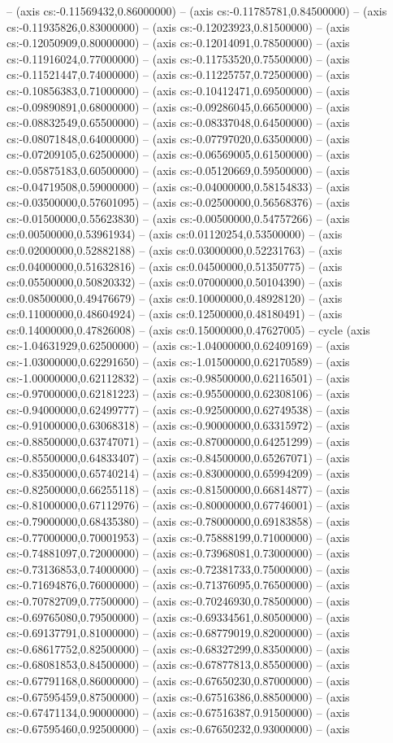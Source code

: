 -- (axis cs:-0.11569432,0.86000000) -- (axis cs:-0.11785781,0.84500000) -- (axis cs:-0.11935826,0.83000000) -- (axis cs:-0.12023923,0.81500000) -- (axis cs:-0.12050909,0.80000000) -- (axis cs:-0.12014091,0.78500000) -- (axis cs:-0.11916024,0.77000000) -- (axis cs:-0.11753520,0.75500000) -- (axis cs:-0.11521447,0.74000000) -- (axis cs:-0.11225757,0.72500000) -- (axis cs:-0.10856383,0.71000000) -- (axis cs:-0.10412471,0.69500000) -- (axis cs:-0.09890891,0.68000000) -- (axis cs:-0.09286045,0.66500000) -- (axis cs:-0.08832549,0.65500000) -- (axis cs:-0.08337048,0.64500000) -- (axis cs:-0.08071848,0.64000000) -- (axis cs:-0.07797020,0.63500000) -- (axis cs:-0.07209105,0.62500000) -- (axis cs:-0.06569005,0.61500000) -- (axis cs:-0.05875183,0.60500000) -- (axis cs:-0.05120669,0.59500000) -- (axis cs:-0.04719508,0.59000000) -- (axis cs:-0.04000000,0.58154833) -- (axis cs:-0.03500000,0.57601095) -- (axis cs:-0.02500000,0.56568376) -- (axis cs:-0.01500000,0.55623830) -- (axis cs:-0.00500000,0.54757266) -- (axis cs:0.00500000,0.53961934) -- (axis cs:0.01120254,0.53500000) -- (axis cs:0.02000000,0.52882188) -- (axis cs:0.03000000,0.52231763) -- (axis cs:0.04000000,0.51632816) -- (axis cs:0.04500000,0.51350775) -- (axis cs:0.05500000,0.50820332) -- (axis cs:0.07000000,0.50104390) -- (axis cs:0.08500000,0.49476679) -- (axis cs:0.10000000,0.48928120) -- (axis cs:0.11000000,0.48604924) -- (axis cs:0.12500000,0.48180491) -- (axis cs:0.14000000,0.47826008) -- (axis cs:0.15000000,0.47627005) -- cycle (axis cs:-1.04631929,0.62500000) -- (axis cs:-1.04000000,0.62409169) -- (axis cs:-1.03000000,0.62291650) -- (axis cs:-1.01500000,0.62170589) -- (axis cs:-1.00000000,0.62112832) -- (axis cs:-0.98500000,0.62116501) -- (axis cs:-0.97000000,0.62181223) -- (axis cs:-0.95500000,0.62308106) -- (axis cs:-0.94000000,0.62499777) -- (axis cs:-0.92500000,0.62749538) -- (axis cs:-0.91000000,0.63068318) -- (axis cs:-0.90000000,0.63315972) -- (axis cs:-0.88500000,0.63747071) -- (axis cs:-0.87000000,0.64251299) -- (axis cs:-0.85500000,0.64833407) -- (axis cs:-0.84500000,0.65267071) -- (axis cs:-0.83500000,0.65740214) -- (axis cs:-0.83000000,0.65994209) -- (axis cs:-0.82500000,0.66255118) -- (axis cs:-0.81500000,0.66814877) -- (axis cs:-0.81000000,0.67112976) -- (axis cs:-0.80000000,0.67746001) -- (axis cs:-0.79000000,0.68435380) -- (axis cs:-0.78000000,0.69183858) -- (axis cs:-0.77000000,0.70001953) -- (axis cs:-0.75888199,0.71000000) -- (axis cs:-0.74881097,0.72000000) -- (axis cs:-0.73968081,0.73000000) -- (axis cs:-0.73136853,0.74000000) -- (axis cs:-0.72381733,0.75000000) -- (axis cs:-0.71694876,0.76000000) -- (axis cs:-0.71376095,0.76500000) -- (axis cs:-0.70782709,0.77500000) -- (axis cs:-0.70246930,0.78500000) -- (axis cs:-0.69765080,0.79500000) -- (axis cs:-0.69334561,0.80500000) -- (axis cs:-0.69137791,0.81000000) -- (axis cs:-0.68779019,0.82000000) -- (axis cs:-0.68617752,0.82500000) -- (axis cs:-0.68327299,0.83500000) -- (axis cs:-0.68081853,0.84500000) -- (axis cs:-0.67877813,0.85500000) -- (axis cs:-0.67791168,0.86000000) -- (axis cs:-0.67650230,0.87000000) -- (axis cs:-0.67595459,0.87500000) -- (axis cs:-0.67516386,0.88500000) -- (axis cs:-0.67471134,0.90000000) -- (axis cs:-0.67516387,0.91500000) -- (axis cs:-0.67595460,0.92500000) -- (axis cs:-0.67650232,0.93000000) -- (axis 